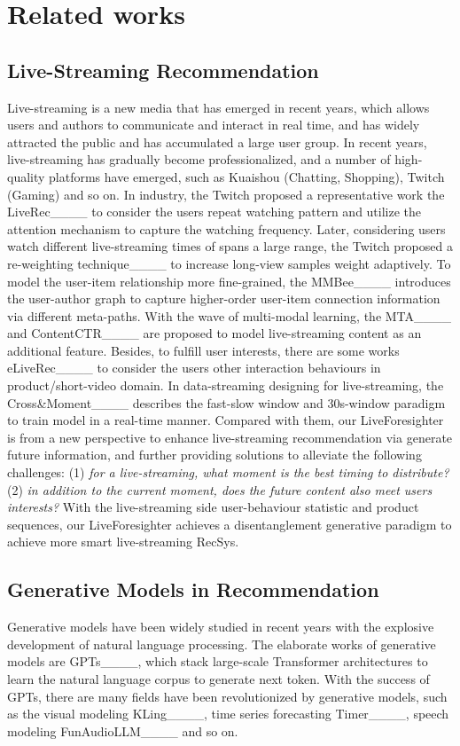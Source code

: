 \section{Related works}
\subsection{Live-Streaming Recommendation}
Live-streaming is a new media that has emerged in recent years, which allows users and authors to communicate and interact in real time, and has widely attracted the public and has accumulated a large user group. 
%
In recent years, live-streaming has gradually become professionalized, and a number of high-quality platforms have emerged, such as Kuaishou (Chatting, Shopping), Twitch (Gaming) and so on.
%
In industry, the Twitch proposed a representative work the LiveRec____ to consider the users repeat watching pattern and utilize the attention mechanism to capture the watching frequency.
%
Later, considering users watch different live-streaming times of spans a large range, the Twitch proposed a re-weighting technique____ to increase long-view samples weight adaptively.
%
To model the user-item relationship more fine-grained, the MMBee____ introduces the user-author graph to capture higher-order user-item connection information via different meta-paths.
%
With the wave of multi-modal learning, the MTA____ and ContentCTR____ are proposed to model live-streaming content as an additional feature.
%
Besides, to fulfill user interests, there are some works eLiveRec____ to consider the users other interaction behaviours in product/short-video domain.
%
In data-streaming designing for live-streaming, the Cross\&Moment____ describes the fast-slow window and 30s-window paradigm to train model in a real-time manner.
%
Compared with them, our LiveForesighter is from a new perspective to enhance live-streaming recommendation via generate future information, and further providing solutions to alleviate the following challenges:
%
(1) \textit{for a live-streaming, what moment is the best timing to distribute?}
%
(2) \textit{in addition to the current moment, does the future content also meet users interests?}
%
With the live-streaming side user-behaviour statistic and product sequences, our LiveForesighter achieves a disentanglement generative paradigm to achieve more smart live-streaming RecSys.







\subsection{Generative Models in Recommendation}
Generative models have been widely studied in recent years with the explosive development of natural language processing.
%
The elaborate works of generative models are GPTs____, which stack large-scale Transformer architectures to learn the natural language corpus to generate next token.
%
With the success of GPTs, there are many fields have been revolutionized by generative models, such as the visual modeling KLing____, time series forecasting Timer____, speech modeling FunAudioLLM____ and so on. 
%

